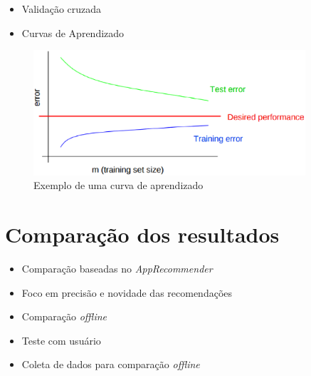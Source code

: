 \begin{frame}

    \begin{itemize}
        \item Validação cruzada
        \item Curvas de Aprendizado
    \end{itemize}

\end{frame}

\begin{frame}

\begin{figure}[h]
  \centering
  \includegraphics[width=0.9\textwidth]{figura/curva_aprendizado.eps}
  \caption{Exemplo de uma curva de aprendizado}
  \label{fig:curva_aprendizado}
\end{figure}

\end{frame}


\label{sec:aprendizado_maquina}

\section{Comparação dos resultados} %
\label{sec:comparacao_resultados}

\begin{frame}
    \begin{itemize}
        \item Comparação baseadas no \textit{AppRecommender}
        \item Foco em precisão e novidade das recomendações
        \item Comparação \textit{offline}
        \item Teste com usuário
        \item Coleta de dados para comparação \textit{offline}
    \end{itemize}
\end{frame}

